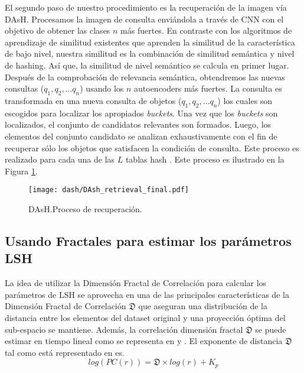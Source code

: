 El segundo paso de nuestro procedimiento es la recuperación de la imagen vía  DAsH. Procesamos la imagen de consulta enviándola a través de CNN con el objetivo de obtener las clases $n$ más fuertes. En contraste con los algoritmos de aprendizaje de similitud existentes que aprenden la similitud de la característica de bajo nivel, nuestra similitud es la combinación de similitud semántica y nivel de hashing. Así que, la similitud de nivel semántico se calcula en primer lugar. Después de la comprobación de relevancia semántica, obtendremos las nuevas consultas ($q_1, q_2, ... q_n$) usando los  $n$ autoencoders más fuertes. La consulta es transformada en una nueva consulta de objetos ($q_1, q_2, ... q_n$) los cuales son escogidos para localizar los apropiados \textit{buckets}. Una vez que los \textit{buckets} son localizados, el conjunto de candidatos relevantes son formados.  Luego, los elementos del conjunto candidato se analizan exhaustivamente con el fin de recuperar sólo los objetos que satisfacen la condición de consulta. Este proceso es realizado para cada una de las  $L$ tablas hash . Este proceso es ilustrado en la Figura \ref{fig:qdash}.  
\begin{figure}[htp]\centering
\label{fig:qdash}
 \texttt{[image: dash/DAsh\_retrieval\_final.pdf]} 
\caption{ DAsH.Proceso de recuperación. } 
\end{figure}
 
 
 \subsection{Usando Fractales para estimar los parámetros LSH}
 

La idea de utilizar la Dimensión Fractal de Correlación para calcular los parámetros de LSH se aprovecha en una de las principales características de la Dimensión Fractal de Correlación $\mathfrak{D}$ que aseguran una distribución de la distancia entre los elementos del dataset original y una proyección óptima del sub-espacio se mantiene.  Además, la correlación dimensión fractal $\mathfrak{D}$ se puede estimar en tiempo lineal como se representa en \cite{Faloutsos:2000:SJS:335191.335412}  y \cite{traina2010fast}.  El exponente de distancia $\mathfrak{D}$ tal como está representado en \cite{Faloutsos:2000:SJS:335191.335412} es.
	\begin{equation}\label{eq:logpc_fractal}
	   log(PC(r)) = \mathfrak{D} \times log (r) + K_p 		
	\end{equation}
	
